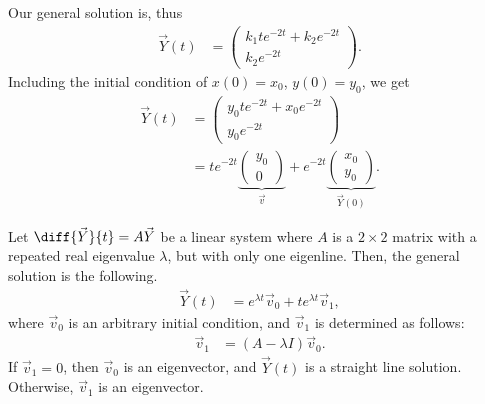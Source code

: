 \documentclass[10pt]{mypackage}
\begin{document}
Our general solution is, thus
\begin{align*}
  \vec{Y}(t) &= \begin{pmatrix}k_1te^{-2t} + k_2e^{-2t}\\ k_2e^{-2t}\end{pmatrix}.
\end{align*}
Including the initial condition of $x(0) = x_0$, $y(0) = y_0$, we get
\begin{align*}
  \vec{Y}(t) &= \begin{pmatrix}y_0te^{-2t} + x_0e^{-2t} \\ y_0e^{-2t}\end{pmatrix}\\
             &= te^{-2t} \underbrace{\begin{pmatrix}y_0\\0\end{pmatrix}}_{\vec{v}} + e^{-2t} \underbrace{\begin{pmatrix}x_0\\y_0\end{pmatrix}}_{\vec{Y}(0)}.
\end{align*}
\begin{theorem}
  Let $\diff{\vec{Y}}{t} = A\vec{Y}$ be a linear system where $A$ is a $2\times 2$ matrix with a repeated real eigenvalue $\lambda$, but with only one eigenline. Then, the general solution is the following.
  \begin{align*}
    \vec{Y}(t) &= e^{\lambda t} \vec{v}_0 + te^{\lambda t}\vec{v}_1,
  \end{align*}
  where $\vec{v}_0$ is an arbitrary initial condition, and $\vec{v}_1$ is determined as follows:
  \begin{align*}
    \vec{v}_1 &= \left(A- \lambda I\right)\vec{v}_0.
  \end{align*}
  If $\vec{v}_1 = 0$, then $\vec{v}_0$ is an eigenvector, and $\vec{Y}(t)$ is a straight line solution. Otherwise, $\vec{v}_1$ is an eigenvector.
\end{theorem}
\end{document}

